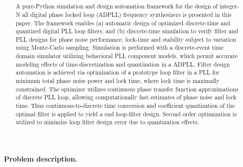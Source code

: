 

\pagestyle{fancy}
\fancyhf{}
\lhead{\fontfamily{\sfdefault}\selectfont \textbf{\leftmark}}

\title{\textbf{}}
\date{}

\sloppy\raggedright
	
	
	\pagebreak
	\thispagestyle{blank}
	\null\pagebreak

	\setcounter{page}{1}
	\pagebreak
	\thispagestyle{nohdr}
	\begin{abstract}
		\large\fontfamily{\rmdefault}\selectfont 
		A pure-Python simulation and design automation framework for the design of integer-N all digital phase locked loop (ADPLL) frequency synthesizers is presented in this paper. The framework enables (a) automatic design of optimized discrete-time and quantized digital PLL loop filters, and (b) discrete-time simulation to verify filter and PLL designs for phase noise performance, lock-time and stability subject to variation using Monte-Carlo sampling. Simulation is performed with a discrete-event time domain simulator utilizing behavioral PLL component models, which permit accurate modeling effects of time-discretization and quantization in a ADPLL. Filter design automation is achieved via optimization of a prototype loop filter in a PLL for minimum total phase noise power and lock time, where lock time is maximally constrained. The optimizer utilizes continuous phase transfer function approximations of discrete PLL loop, allowing computationally fast estimates of phase noise and lock time. Thus continuous-to-discrete time conversion and coefficient quantization of the optimal filter is applied to yield a end loop-filter design. Second order optimization is utilized to minimize loop filter design error due to quantization effects.
	\end{abstract}

	\pagebreak
	\thispagestyle{nohdr}
	\null\pagebreak
	\thispagestyle{nohdr}
	\Huge\textbf{Problem description.}\\
	\vspace{1em}
	\large\fontfamily{\rmdefault}\selectfont 
	

